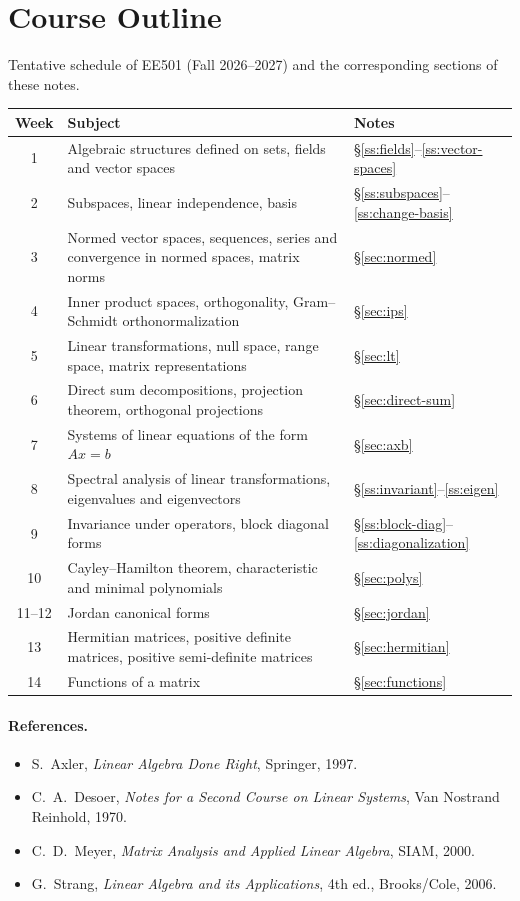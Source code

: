 \tableofcontents
\clearpage

\section*{Course Outline}
Tentative schedule of EE501 (Fall 2026--2027) and the corresponding sections of these notes.
{\renewcommand{\arraystretch}{1.25}
\begin{longtable}{@{}c p{8.2cm} l@{}}
\toprule
\textbf{Week} & \textbf{Subject} & \textbf{Notes} \\
\midrule
\endhead
1 & Algebraic structures defined on sets, fields and vector spaces & \S\ref{ss:fields}--\ref{ss:vector-spaces} \\
2 & Subspaces, linear independence, basis & \S\ref{ss:subspaces}--\ref{ss:change-basis} \\
3 & Normed vector spaces, sequences, series and convergence in normed spaces, matrix norms & \S\ref{sec:normed} \\
4 & Inner product spaces, orthogonality, Gram--Schmidt orthonormalization & \S\ref{sec:ips} \\
5 & Linear transformations, null space, range space, matrix representations & \S\ref{sec:lt} \\
6 & Direct sum decompositions, projection theorem, orthogonal projections & \S\ref{sec:direct-sum} \\
7 & Systems of linear equations of the form $Ax=b$ & \S\ref{sec:axb} \\
8 & Spectral analysis of linear transformations, eigenvalues and eigenvectors & \S\ref{ss:invariant}--\ref{ss:eigen} \\
9 & Invariance under operators, block diagonal forms & \S\ref{ss:block-diag}--\ref{ss:diagonalization} \\
10 & Cayley--Hamilton theorem, characteristic and minimal polynomials & \S\ref{sec:polys} \\
11--12 & Jordan canonical forms & \S\ref{sec:jordan} \\
13 & Hermitian matrices, positive definite matrices, positive semi-definite matrices & \S\ref{sec:hermitian} \\
14 & Functions of a matrix & \S\ref{sec:functions} \\
\bottomrule
\end{longtable}
}

\paragraph{References.}
\begin{itemize}[nosep]
\item S.~Axler, \textit{Linear Algebra Done Right}, Springer, 1997.
\item C.~A.~Desoer, \textit{Notes for a Second Course on Linear Systems}, Van Nostrand Reinhold, 1970.
\item C.~D.~Meyer, \textit{Matrix Analysis and Applied Linear Algebra}, SIAM, 2000.
\item G.~Strang, \textit{Linear Algebra and its Applications}, 4th ed., Brooks/Cole, 2006.
\end{itemize}
\clearpage

